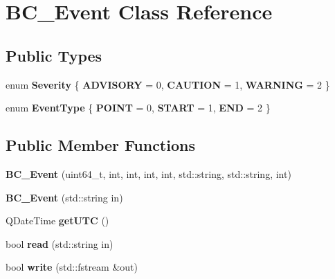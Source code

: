 \hypertarget{class_b_c___event}{}\section{B\+C\+\_\+\+Event Class Reference}
\label{class_b_c___event}
\subsection*{Public Types}
\begin{DoxyCompactItemize}
\item 
enum {\bfseries Severity} \{ {\bfseries A\+D\+V\+I\+S\+O\+RY} = 0, 
{\bfseries C\+A\+U\+T\+I\+ON} = 1, 
{\bfseries W\+A\+R\+N\+I\+NG} = 2
 \}\hypertarget{class_b_c___event_a5eb4855476ea60e493118e250e27ea1e}{}\label{class_b_c___event_a5eb4855476ea60e493118e250e27ea1e}

\item 
enum {\bfseries Event\+Type} \{ {\bfseries P\+O\+I\+NT} = 0, 
{\bfseries S\+T\+A\+RT} = 1, 
{\bfseries E\+ND} = 2
 \}\hypertarget{class_b_c___event_af0659c0fa8f9fad210dc9be784232b19}{}\label{class_b_c___event_af0659c0fa8f9fad210dc9be784232b19}

\end{DoxyCompactItemize}
\subsection*{Public Member Functions}
\begin{DoxyCompactItemize}
\item 
{\bfseries B\+C\+\_\+\+Event} (uint64\+\_\+t, int, int, int, int, std\+::string, std\+::string, int)\hypertarget{class_b_c___event_a68ce3b239302b717104c8eb7f40e4bef}{}\label{class_b_c___event_a68ce3b239302b717104c8eb7f40e4bef}

\item 
{\bfseries B\+C\+\_\+\+Event} (std\+::string in)\hypertarget{class_b_c___event_af78e84637a9875dec516e185f35c1d1c}{}\label{class_b_c___event_af78e84637a9875dec516e185f35c1d1c}

\item 
Q\+Date\+Time {\bfseries get\+U\+TC} ()\hypertarget{class_b_c___event_a1760bf16d64ca7f717c8802b4a59df4d}{}\label{class_b_c___event_a1760bf16d64ca7f717c8802b4a59df4d}

\item 
bool {\bfseries read} (std\+::string in)\hypertarget{class_b_c___event_aae93e7ef80d9e7884391835dfe95cdcf}{}\label{class_b_c___event_aae93e7ef80d9e7884391835dfe95cdcf}

\item 
bool {\bfseries write} (std\+::fstream \&out)\hypertarget{class_b_c___event_af5ed2ed542f460db793ad623b9aacd3a}{}\label{class_b_c___event_af5ed2ed542f460db793ad623b9aacd3a}

\end{DoxyCompactItemize}
